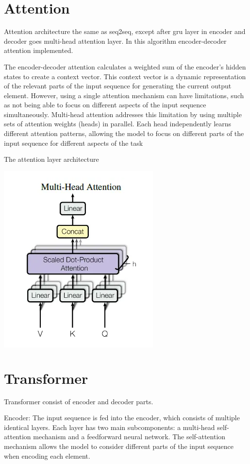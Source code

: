 \documentclass{article}
\begin{document}
\section{Attention}
Attention architecture the same as seq2seq, except after gru layer in encoder and decoder goes multi-head attention layer.
In this algorithm encoder-decoder attention implemented.

The encoder-decoder attention calculates a weighted sum of the encoder's hidden states to create a context vector. This context vector is a dynamic representation of the relevant parts of the input sequence for generating the current output element. However, using a single attention mechanism can have limitations, such as not being able to focus on different aspects of the input sequence simultaneously. Multi-head attention addresses this limitation by using multiple sets of attention weights (heads) in parallel. Each head independently learns different attention patterns, allowing the model to focus on different parts of the input sequence for different aspects of the task

The attention layer architecture

\includegraphics[scale=0.8]{figures/Attention_attentionblockpng.png}

\section{Transformer}
Transformer consist of encoder and decoder parts.

Encoder: The input sequence is fed into the encoder, which consists of multiple identical layers. Each layer has two main subcomponents: a multi-head self-attention mechanism and a feedforward neural network. The self-attention mechanism allows the model to consider different parts of the input sequence when encoding each element.
\end{document}
